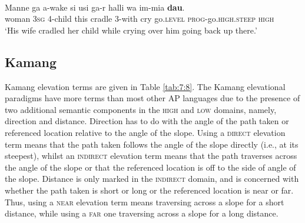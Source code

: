 \ea%
\label{ex:7:37}
 \\
\gll Manne   ga{\ng}  a-wake  si{\ng}  usi{\ng}  ga-r  halli  wa  im-mia  \textbf{dau}. \\
   woman  \textsc{3sg} 4-child  this    cradle  3-with  cry  go.\textsc{level}   \textsc{prog}{}-go.\textsc{high.steep} \textsc {high   } \\
\glt  `His wife cradled her child while crying over him going back up there.'
\z


 

\subsection{Kamang}
Kamang elevation terms are given in Table \ref{tab:7:8}. The Kamang elevational paradigms have more terms than most other AP languages due to the presence of two additional semantic components in the \textsc{high} and \textsc{low} domains, namely, direction and distance. Direction has to do with the angle of the path taken or referenced location relative to the angle of the slope. Using a \textsc{direct} elevation term means that the path taken follows the angle of the slope directly (i.e., at its steepest), whilst an \textsc{indirect} elevation term means that the path traverses across the angle of the slope or that the referenced location is off to the side of angle of the slope. Distance is only marked in the \textsc{indirect} domain, and is concerned with whether the path taken is short or long or the referenced location is near or far. Thus, using a \textsc{near} elevation term means traversing across a slope for a short distance, while using a \textsc{far} one traversing across a slope for a long distance.

 

